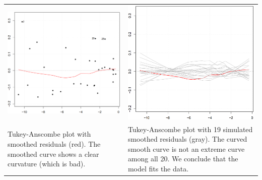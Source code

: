 \begin{table}[H]
  \setlength{\tabcolsep}{0.2em}
  \scriptsize
  \begin{tabular}{p{}@{\hskip 1em}p{}}
    \includegraphics[width=\linewidth]{Pics/8.2.5.png}& \includegraphics[width=\linewidth]{Pics/8.2.6.png} \\
    Tukey-Anscombe plot with smoothed residuals (red). The smoothed curve shows a clear curvature (which is bad). &
    Tukey-Anscombe plot with 19 simulated smoothed residuals (gray). The curved smooth curve is not an extreme curve among all 20. We conclude that the model fits the data.\\
  \end{tabular}
\end{table}

